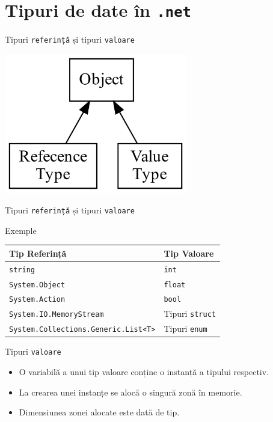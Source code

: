 \documentclass[presentation]{beamer}
\begin{document}
\section{Tipuri de date în \texttt{.net}}
\label{sec:orgaed4876}
\begin{frame}[label={sec:orgbb5567a},fragile]{Tipuri \texttt{referință} și tipuri \texttt{valoare}}
 \begin{center}
\includegraphics[width=0.6\textwidth]{./img/netcore-types.png}
\end{center}
\end{frame}
\begin{frame}[label={sec:orgc6c8715},fragile]{Tipuri \texttt{referință} și tipuri \texttt{valoare}}
 \begin{block}{Exemple}
\begin{center}
\begin{tabular}{ll}
Tip Referință & Tip Valoare\\
\hline
\texttt{string} & \texttt{int}\\
\texttt{System.Object} & \texttt{float}\\
\texttt{System.Action} & \texttt{bool}\\
\texttt{System.IO.MemoryStream} & Tipuri \texttt{struct}\\
\texttt{System.Collections.Generic.List<T>} & Tipuri \texttt{enum}\\
\end{tabular}
\end{center}
\end{block}
\end{frame}
\begin{frame}[label={sec:org4a38277},fragile]{Tipuri \texttt{valoare}}
 \begin{itemize}
\item O variabilă a unui tip valoare conține o instanță a tipului respectiv.
\item La crearea unei instanțe se alocă o singură zonă în memorie.
\item Dimensiunea zonei alocate este dată de tip.
\end{itemize}
\end{frame}
\end{document}
